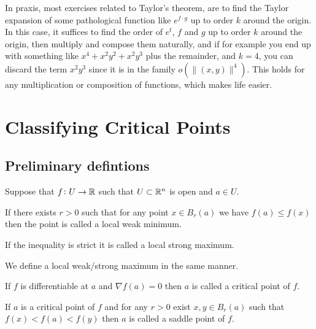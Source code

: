 \documentclass[11pt,a4paper]{article}
\begin{document}
\begin{remark}
  In praxis, most exercises related to Taylor's theorem,
  are to find the Taylor expansion of some pathological function like
  $e^{f \cdot g}$ up to order $k$ around the origin.
  In this case, it suffices to find the order of $e^t$, $f$
  and $g$ up to order $k$ around the origin,
  then multiply and compose them naturally,
  and if for example you end up with something like
  $x^4 + x^2y^2 + x^2y^3$ plus the remainder, and $k=4$,
  you can discard the term $x^2y^3$ since it is 
  in the family $o(\|(x,y)\|^4)$.
  This holds for any multiplication or composition of functions,
  which makes life easier.
\end{remark}

\newpage

\section{Classifying Critical Points}
\subsection{Preliminary defintions}
Suppose that $f \colon U \to \mathbb{R}$ such that $U \subset \mathbb{R}^n$ is open
and $a \in U$.

\begin{definition}
  If there exists $r > 0$ such that for any point $x \in B_r(a)$ we have
  $f(a) \le f(x)$ then the point is called a local weak minimum.
\end{definition}
\begin{remark}
  If the inequality is strict it is called a local strong maximum.
\end{remark}

\begin{remark}
  We define a local weak/strong maximum in the same manner.
\end{remark}

\begin{definition}
  If $f$ is differentiable at $a$ and $\nabla f(a) = 0$ then $a$
  is called a critical point of $f$.
\end{definition}

\begin{definition}
  If $a$ is a critical point of $f$ and for any $r > 0$ exist 
  $x,y \in B_r(a)$ such that $f(x) < f(a) < f(y)$ then $a$ is called
  a saddle point of $f$.
\end{definition}
\end{document}
